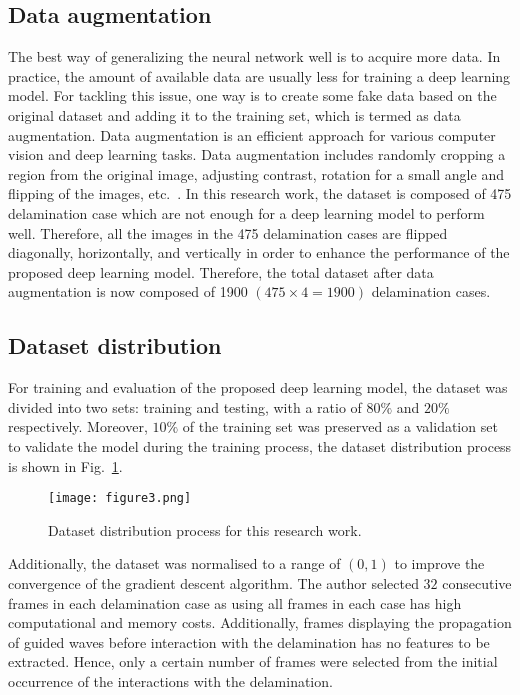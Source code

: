 \subsection{Data augmentation}
The best way of generalizing the neural network well is to acquire more data. 
In practice, the amount of available data are usually less for training a deep 
learning model. 
For tackling this issue, one way is to create some fake data based on the 
original dataset and adding it to the training set, which is termed as data 
augmentation. 
Data augmentation is an efficient approach for various computer vision and deep 
learning tasks. 
Data augmentation includes randomly cropping a region from the original image, 
adjusting contrast, rotation for a small angle and flipping of the images, 
etc.~\cite{szegedy2015going}.
In this research work, the dataset is composed of 475 delamination case which 
are not enough for a deep learning model to perform well.
Therefore, all the images in the 475 delamination cases are flipped diagonally, 
horizontally, and vertically in order to enhance the performance of the 
proposed deep learning model. 
Therefore, the total dataset after data augmentation is now composed of 1900 
\((475\times4 = 1900)\) delamination cases.
\subsection{Dataset distribution}
For training and evaluation of the proposed deep learning model, the dataset 
was divided into two sets: training and testing, with 
a ratio of \(80\%\) and \(20\% \) respectively.
Moreover, \(10\%\) of the training set was preserved as a validation 
set to validate the model during the training process, the dataset distribution 
process is shown in Fig.~\ref{fig:data_distribution}.
\begin{figure} [h!]
	\begin{center}
		\texttt{[image: figure3.png]}
	\end{center}
	\caption{Dataset distribution process for this research work.} 
	\label{fig:data_distribution}
\end{figure}
Additionally, the dataset was normalised to a range of \((0, 1)\) to improve 
the convergence of the gradient descent algorithm.
The author selected \(32\) consecutive frames in each delamination case as 
using all frames in each case has high computational and memory 
costs.
Additionally, frames displaying the propagation of guided waves before 
interaction with the delamination has no features to be extracted.
Hence, only a certain number of frames were selected from the initial 
occurrence of the interactions with the delamination.
